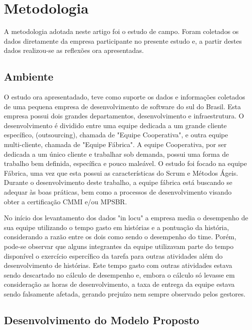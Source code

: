 \section{Metodologia}
A metodologia adotada neste artigo foi o estudo de campo. Foram coletados os dados diretamente da empresa participante no presente estudo e, a partir destes dados realizou-se as reflexões ora apresentadas.\par

\subsection{Ambiente}
O estudo ora apresentadado, teve como suporte os dados e informações coletados de uma pequena empresa de desenvolvimento de software do sul do Brasil. Esta empresa possui dois grandes departamentos, desenvolvimento e infraestrutura. O desenvolvimento é dividido entre uma equipe dedicada a um grande cliente específico,  (outsourcing), chamada de "Equipe Cooperativa", e outra equipe multi-cliente, chamada de "Equipe Fábrica". A equipe Cooperativa, por ser dedicada a um único cliente e trabalhar sob demanda, possui uma forma de trabalho bem definida, específica e pouco maleável. O estudo foi focado na equipe Fábrica, uma vez que esta possui as características do Scrum e Métodos Ágeis. Durante o desenvolvimento deste trabalho, a equipe fábrica está buscando se adequar às boas práticas, bem como a processos de desenvolvimento visando  obter a certificação CMMI e/ou MPSBR.\par
No início dos levantamento dos dados "in locu"  a empresa media o desempenho de sua equipe utilizando o tempo gasto em histórias e a pontuação da história, considerando a razão entre os dois como sendo o desempenho do time. Porém, pode-se observar que alguns integrantes da equipe utilizavam parte do tempo disponível o exercício espercífico da tarefa para outras atividades além do desenvolvimento de histórias. Este tempo gasto com outras atividades estava sendo descartado no cálculo de desempenho e, embora o cálculo só levasse em consideração as horas de desenvolvimento, a taxa de entrega da equipe estava sendo falsamente afetada, gerando prejuízo nem sempre observado pelos gestores.\par

\subsection{Desenvolvimento do Modelo Proposto}


